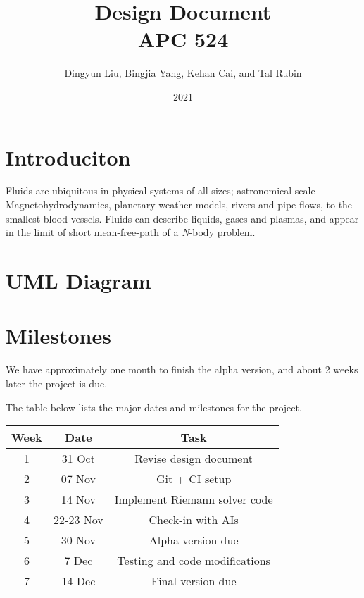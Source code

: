 \documentclass[aip, amsmath, amssymb, preprint,floatfix]{revtex4-2}
\begin{document}
\title{Design Document\\APC 524}
\date{2021}

\author{Dingyun Liu, Bingjia Yang, Kehan Cai, and Tal Rubin}
\maketitle

\section{Introduciton}

Fluids are ubiquitous in physical systems of all sizes; astronomical-scale Magnetohydrodynamics, planetary weather models, rivers and pipe-flows, to the smallest blood-vessels. Fluids can describe liquids, gases and plasmas, and appear in the limit of short mean-free-path of a \textit{N}-body problem.


\section{UML Diagram}

\section{Milestones}

We have approximately one month to finish the alpha version, and about 2 weeks later the project is due.

The table below lists the major dates and milestones for the project.

\begin{tabular}{c|c|c}
    Week & Date & Task \\
    \hline
    1 & 31 Oct & Revise design document \\
    2 & 07 Nov & Git + CI setup \\
    3 & 14 Nov & Implement Riemann solver code \\
    4 & 22-23 Nov & Check-in with AIs \\
    5 & 30 Nov & Alpha version due \\
    6 & 7 Dec & Testing and code modifications \\
    7 & 14 Dec & Final version due \\
\end{tabular}
\end{document}
